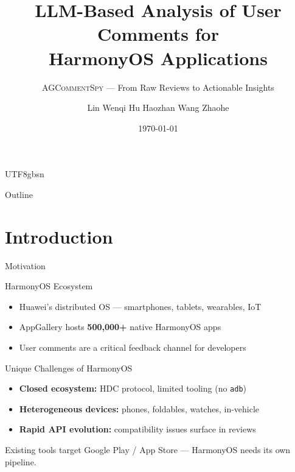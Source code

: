 \documentclass[11pt,aspectratio=169]{beamer}
\title[AGCommentSpy]{LLM-Based Analysis of User Comments for\\HarmonyOS Applications}
\subtitle{\textsc{AGCommentSpy} --- From Raw Reviews to Actionable Insights}
\author{Lin Wenqi \quad Hu Haozhan \quad Wang Zhaohe}
\institute{CS326 Project}
\date{\today}
\begin{document}
\begin{CJK*}{UTF8}{gbsn}

\begin{frame}
  \titlepage
\end{frame}

\begin{frame}{Outline}
  \tableofcontents
\end{frame}

\section{Introduction}

\begin{frame}{Motivation}
  \begin{block}{HarmonyOS Ecosystem}
    \begin{itemize}
      \item Huawei's distributed OS --- smartphones, tablets, wearables, IoT
      \item AppGallery hosts \textbf{500,000+} native HarmonyOS apps
      \item User comments are a critical feedback channel for developers
    \end{itemize}
  \end{block}

  \begin{block}{Unique Challenges of HarmonyOS}
    \begin{itemize}
      \item \textbf{Closed ecosystem:} HDC protocol, limited tooling (no \texttt{adb})
      \item \textbf{Heterogeneous devices:} phones, foldables, watches, in-vehicle
      \item \textbf{Rapid API evolution:} compatibility issues surface in reviews
    \end{itemize}
  \end{block}

  \begin{center}
    \small Existing tools target Google Play / App Store --- HarmonyOS needs its own pipeline.
  \end{center}
\end{frame}


\end{CJK*}
\end{document}
